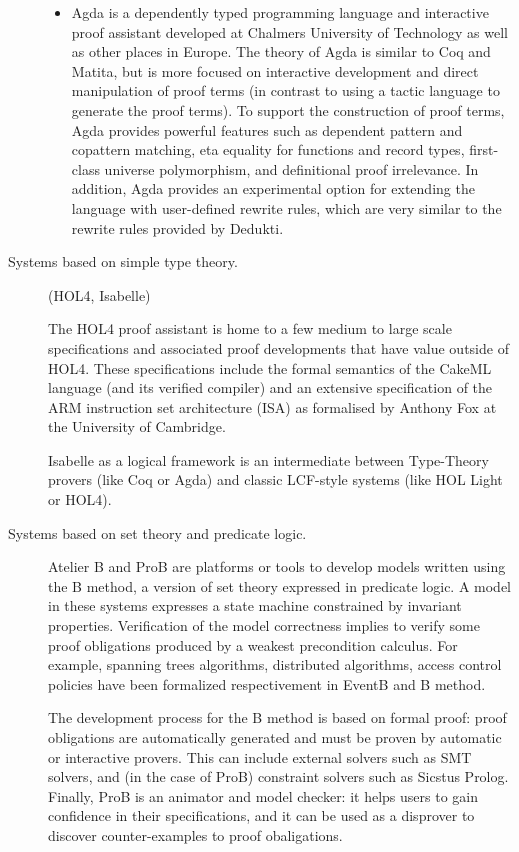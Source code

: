 \begin{description}
\begin{itemize}
    \item Agda is a dependently typed programming language and
    interactive proof assistant developed at Chalmers University of
    Technology as well as other places in Europe. The theory of Agda
    is similar to Coq and Matita, but is more focused on interactive
    development and direct manipulation of proof terms (in contrast to
    using a tactic language to generate the proof terms). To support
    the construction of proof terms, Agda provides powerful features
    such as dependent pattern and copattern matching, eta equality for
    functions and record types, first-class universe polymorphism, and
    definitional proof irrelevance. In addition, Agda provides an
    experimental option for extending the language with user-defined
    rewrite rules, which are very similar to the rewrite rules
    provided by Dedukti.
  \end{itemize}

  \item[Systems based on simple type theory.] (HOL4, Isabelle)

  The HOL4 proof assistant is home to a few medium to large scale
  specifications and associated proof developments that have value
  outside of HOL4. These specifications include the formal semantics
  of the CakeML language (and its verified compiler) and an extensive
  specification of the ARM instruction set architecture (ISA) as
  formalised by Anthony Fox at the University of Cambridge.

  Isabelle as a logical framework \cite{paulson700} is an intermediate
  between Type-Theory provers (like Coq or Agda) and classic LCF-style
  systems (like HOL Light or HOL4).

\item[Systems based on set theory and predicate logic.] Atelier B and
  ProB are platforms or tools to develop models written using the B
  method, a version of set theory expressed in predicate logic.  A
  model in these systems expresses a state machine constrained by
  invariant properties. Verification of the model correctness implies
  to verify some proof obligations produced by a weakest precondition
  calculus. For example, spanning trees algorithms, distributed
  algorithms, access control policies have been formalized
  respectivement in EventB and B method.

  The development process for the B method is based on formal proof:
  proof obligations are automatically generated and must be proven by
  automatic or interactive provers. This can include external solvers
  such as SMT solvers, and (in the case of ProB) constraint solvers
  such as Sicstus Prolog. Finally, ProB is an animator and model
  checker: it helps users to gain confidence in their specifications,
  and it can be used as a disprover to discover counter-examples to
  proof obaligations.


\end{description}
